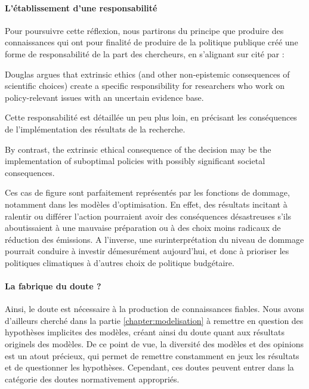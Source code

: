 \paragraph{L'établissement d'une responsabilité}

Pour poursuivre cette réflexion, nous partirons du principe que produire des connaissances qui ont pour finalité de produire de la politique publique créé une forme de responsabilité de la part des chercheurs, en s'alignant sur \textcite{douglas_values_2014, douglas_science_2009} cité par \autocite{beck_epistemic_2016} : 


\begin{authoredquote}
    Douglas argues that extrinsic ethics (and other non-epistemic consequences of scientific choices) create a specific responsibility for researchers who work on policy-relevant issues with an uncertain evidence base. 
\end{authoredquote}

Cette responsabilité est détaillée un peu plus loin, en précisant les conséquences de l'implémentation des résultats de la recherche. 

\begin{authoredquote}
     By contrast, the extrinsic ethical consequence of the decision may be the implementation of suboptimal policies with possibly significant societal consequences.
\end{authoredquote}

Ces cas de figure sont parfaitement représentés par les fonctions de dommage, notamment dans les modèles d'optimisation. En effet, des résultats incitant à ralentir ou différer l'action pourraient avoir des conséquences désastreuses s'ils aboutissaient à une mauvaise préparation ou à des choix moins radicaux de réduction des émissions. A l'inverse, une surinterprétation du niveau de dommage pourrait conduire à investir démesurément aujourd'hui, et donc à prioriser les politiques climatiques à d'autres choix de politique budgétaire. 

\paragraph{La fabrique du doute ?}

Ainsi, le doute est nécessaire à la production de connaissances fiables. Nous avons d'ailleurs cherché dans la partie \ref{chapter:modelisation} à remettre en question des hypothèses implicites des modèles, créant ainsi du doute quant aux résultats originels des modèles. De ce point de vue, la diversité des modèles et des opinions est un atout précieux, qui permet de remettre constamment en jeux les résultats et de questionner les hypothèses. Cependant, ces doutes peuvent entrer dans la catégorie des doutes normativement appropriés. \\

